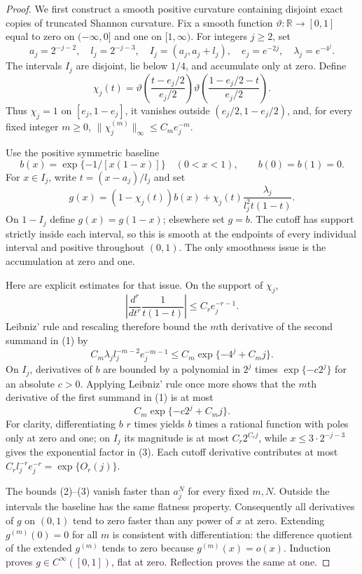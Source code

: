 \begin{proof}
We first construct a smooth positive curvature containing disjoint exact
copies of truncated Shannon curvature.  Fix a smooth function
$\vartheta:\mathbb R\to[0,1]$ equal to zero on $(-\infty,0]$ and one on
$[1,\infty)$.  For integers $j\geq2$, set
\[
 a_j=2^{-j-2},\quad l_j=2^{-j-3},\quad
 I_j=(a_j,a_j+l_j),\quad e_j=e^{-2j},\quad \lambda_j=e^{-4^j}.
\]
The intervals $I_j$ are disjoint, lie below $1/4$, and accumulate only
at zero.  Define
\[
 \chi_j(t)=\vartheta\left(\frac{t-e_j/2}{e_j/2}\right)
           \vartheta\left(\frac{1-e_j/2-t}{e_j/2}\right).
\]
Thus $\chi_j=1$ on $[e_j,1-e_j]$, it vanishes outside
$(e_j/2,1-e_j/2)$, and, for every fixed integer $m\geq0$,
$\|\chi_j^{(m)}\|_\infty\leq C_m e_j^{-m}$.

Use the positive symmetric baseline
\[
 b(x)=\exp\{-1/[x(1-x)]\}\quad(0<x<1),\qquad b(0)=b(1)=0.
\]
For $x\in I_j$, write $t=(x-a_j)/l_j$ and set
\[
 g(x)=(1-\chi_j(t))b(x)
       +\chi_j(t)\frac{\lambda_j}{l_j^2t(1-t)}.
 \tag{1}\label{eq:curvature-patch}
\]
On $1-I_j$ define $g(x)=g(1-x)$; elsewhere set $g=b$.
The cutoff has support strictly inside each interval, so this is smooth
at the endpoints of every individual interval and positive throughout
$(0,1)$.  The only smoothness issue is the accumulation at zero and one.

Here are explicit estimates for that issue.  On the support of $\chi_j$,
\[
 \left|\frac{d^r}{dt^r}\frac1{t(1-t)}\right|
 \leq C_r e_j^{-r-1}.
\]
Leibniz' rule and rescaling therefore bound the $m$th derivative of the
second summand in (1) by
\[
 C_m\lambda_j l_j^{-m-2}e_j^{-m-1}
 \leq C_m\exp\{-4^j+C_mj\}.
 \tag{2}\label{eq:target-decay}
\]
On $I_j$, derivatives of $b$ are bounded by a polynomial in $2^j$
times $\exp\{-c2^j\}$ for an absolute $c>0$.  Applying Leibniz'
rule once more shows that the $m$th derivative of the first summand in
(1) is at most
\[
 C_m\exp\{-c2^j+C_mj\}.
 \tag{3}\label{eq:baseline-decay}
\]
For clarity, differentiating $b$ $r$ times yields $b$ times a rational
function with poles only at zero and one; on $I_j$ its magnitude is at
most $C_r2^{C_rj}$, while $x\leq3\cdot2^{-j-3}$ gives the exponential
factor in (3).  Each cutoff derivative contributes at most
$C_r l_j^{-r}e_j^{-r}=\exp\{O_r(j)\}$.

The bounds (2)--(3) vanish faster than $a_j^N$ for every fixed $m,N$.
Outside the intervals the baseline has the same flatness property.
Consequently all derivatives of $g$ on $(0,1)$ tend to zero faster than
any power of $x$ at zero.  Extending $g^{(m)}(0)=0$ for all $m$ is
consistent with differentiation: the difference quotient of the
extended $g^{(m)}$ tends to zero because $g^{(m)}(x)=o(x)$.
Induction proves $g\in C^\infty([0,1])$, flat at zero.  Reflection proves
the same at one.


\end{proof}
